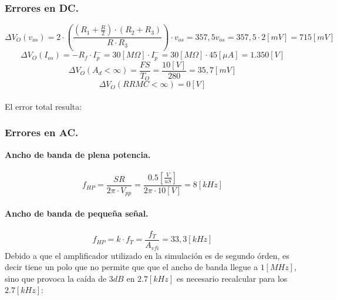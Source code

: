 \documentclass[11pt, a4paper]{article}
\begin{document}
\subsubsection{Errores en DC.}
\onehalfspacing
\begin{equation}
    \nonumber
    \Delta V_{O}(v_{os}) = 2 \cdot \left( \frac{\left( 
R_1 + \frac{R}{2} \right) \cdot \left( R_2 + R_3 \right)}{R \cdot R_3} \right) \cdot v_{os} = 357,5v_{os} = 357,5\cdot 2[mV]  = 715[mV]
\end{equation}
\begin{equation}
    \nonumber
    \Delta V_{O}(I_{os}) = -R_f\cdot I_p^{-} = 30[M\Omega]\cdot I_p^{-} = 30[M\Omega]\cdot 45[\mu A]  = 1.350[V]
\end{equation}
\begin{equation}
    \nonumber
    \Delta V_{O}(A_d<\infty) = \frac{FS}{T_O} = \frac{10[V]}{280} = 35,7[mV]
\end{equation}
\begin{equation}
    \nonumber
    \Delta V_{O}(RRMC<\infty) = 0[V]
\end{equation}

\paragraph{}
El error total resulta: 

\begin{center}
\end{center}

\subsubsection{Errores en AC.}
\onehalfspacing
\textbf{Ancho de banda de plena potencia.} 
\paragraph{}
\begin{equation}
    \nonumber
    f_{HP} = \frac{SR}{2\pi \cdot V_{pp}} =  \frac{0.5\left[ \frac{V}{uS} \right]}{2\pi \cdot 10[V]} = 8[kHz]
\end{equation}

\paragraph{}
\textbf{Ancho de banda de pequeña señal.} 
\paragraph{}
\begin{equation}
    \nonumber
    f_{HP} = k\cdot f_T = \frac{f_T}{A_{vfi}} = 33,3[kHz]
\end{equation}
Debido a que el amplificador utilizado en la simulación es de segundo órden, es decir tiene un polo que no permite que que el ancho de banda llegue a $1[MHz]$, sino que provoca la caída de $3dB$ en $2.7[kHz]$ es necesario recalcular para los $2.7[kHz]$:
\end{document}
